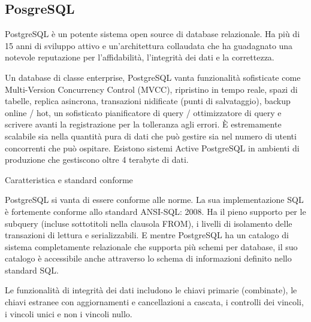 \subsection{PosgreSQL}

PostgreSQL \`{e} un potente sistema open source di database relazionale. Ha pi\`{u} di 15 anni di sviluppo attivo e un'architettura collaudata che ha guadagnato una notevole reputazione per l'affidabilit\`{a}, l'integrit\`{a} dei dati e la correttezza. 

Un database di classe enterprise, PostgreSQL vanta funzionalit\`{a} sofisticate come Multi-Version Concurrency Control (MVCC), ripristino in tempo reale, spazi di tabelle, replica asincrona, transazioni nidificate (punti di salvataggio), backup online / hot, un sofisticato pianificatore di query / ottimizzatore di query e scrivere avanti la registrazione per la tolleranza agli errori. È estremamente scalabile sia nella quantit\`{a} pura di dati che pu\`{o} gestire sia nel numero di utenti concorrenti che pu\`{o} ospitare. Esistono sistemi Active PostgreSQL in ambienti di produzione che gestiscono oltre 4 terabyte di dati. 


Caratteristica e standard conforme

PostgreSQL si vanta di essere conforme alle norme. La sua implementazione SQL è fortemente conforme allo standard ANSI-SQL: 2008. Ha il pieno supporto per le subquery (incluse sottotitoli nella clausola FROM), i livelli di isolamento delle transazioni di lettura e serializzabili. E mentre PostgreSQL ha un catalogo di sistema completamente relazionale che supporta pi\`{u} schemi per database, il suo catalogo \`{e} accessibile anche attraverso lo schema di informazioni definito nello standard SQL.

Le funzionalit\`{a} di integrit\`{a} dei dati includono le chiavi primarie (combinate), le chiavi estranee con aggiornamenti e cancellazioni a cascata, i controlli dei vincoli, i vincoli unici e non i vincoli nullo.

